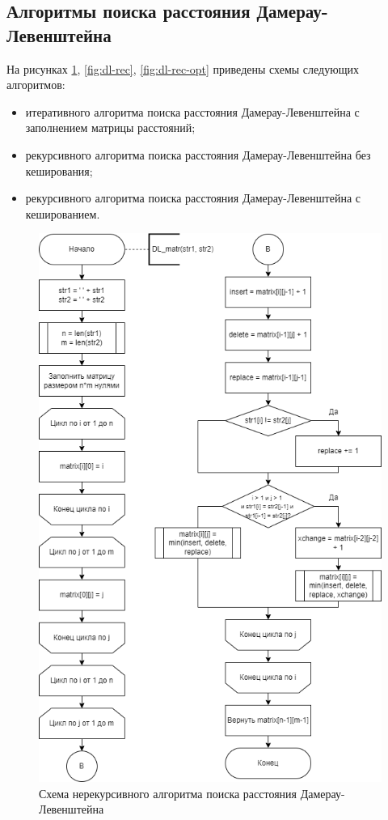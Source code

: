 \subsection{Алгоритмы поиска расстояния Дамерау-Левенштейна}

На рисунках \ref{fig:dl-matr}, \ref{fig:dl-rec}, \ref{fig:dl-rec-opt} приведены схемы следующих алгоритмов:

\begin{itemize}
    \item итеративного алгоритма поиска расстояния Дамерау-Левенштейна с заполнением матрицы расстояний;
    \item рекурсивного алгоритма поиска расстояния Дамерау-Левенштейна без кеширования;
    \item рекурсивного алгоритма поиска расстояния Дамерау-Левенштейна с кешированием.
\end{itemize}
\clearpage

\begin{figure}[h!btp]
    \captionsetup{justification=centering}
	\centering
	\includegraphics[width=380pt]{inc/dl-matr.png}
	\caption{Схема нерекурсивного алгоритма поиска расстояния Дамерау-Левенштейна}
	\label{fig:dl-matr}	
\end{figure}
\clearpage

